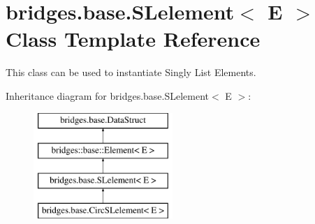 \hypertarget{classbridges_1_1base_1_1_s_lelement}{}\section{bridges.\+base.\+S\+Lelement$<$ E $>$ Class Template Reference}
\label{classbridges_1_1base_1_1_s_lelement}


This class can be used to instantiate Singly List Elements.  


Inheritance diagram for bridges.\+base.\+S\+Lelement$<$ E $>$\+:\begin{figure}[H]
\begin{center}
\leavevmode
\includegraphics[height=4.000000cm]{classbridges_1_1base_1_1_s_lelement}
\end{center}
\end{figure}
